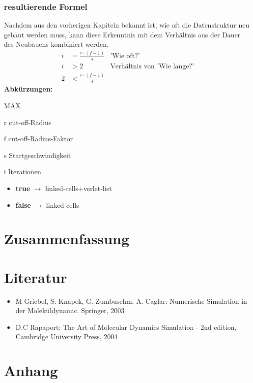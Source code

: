 \documentclass[
	12pt,
	a4paper,
	BCOR10mm,
	DIV14,
	headsepline,
]{scrreprt}
\begin{document}
\subsection{resultierende Formel}
	Nachdem aus den vorherigen Kapiteln bekannt ist, wie oft die Datenstruktur neu gebaut werden muss, kann diese Erkenntnis mit dem Verhältnis aus der Dauer des Neubauens kombiniert werden. 
	\begin{align*}
		i&=\frac{r \cdot (f - 1)}{s} &\text{'Wie oft?'}\\
		i&>2&\text{Verhältnis von 'Wie lange?'}\\
		2&<\frac{r \cdot (f - 1)}{s}
	\end{align*}
	\footnotesize\textbf{Abkürzungen:}\begin{labeling}[~--]{MAX}
		\item[r] cut-off-Radius
		\item[f] cut-off-Radius-Faktor
		\item[s] Startgeschwindigkeit
		\item[i] Iterationen
	\end{labeling}
	
	\begin{itemize}
		\item \textbf{true} $\rightarrow$ linked-cells+verlet-list
		\item \textbf{false} $\rightarrow$ linked-cells
	\end{itemize}

\chapter{Zusammenfassung}
\label{Zusammenfassung}


\chapter{Literatur}
\label{Literatur}

\begin{itemize}
	\item M-Griebel, S. Knapek, G. Zumbuschm, A. Caglar: Numerische Simulation in der Moleküldynamic. Springer, 2003
	\item D.C Rapaport: The Art of Molecular Dynamics Simulation - 2nd edition, Cambridge University Press, 2004
\end{itemize}

\chapter{Anhang}
\label{Anhang}
\end{document}
